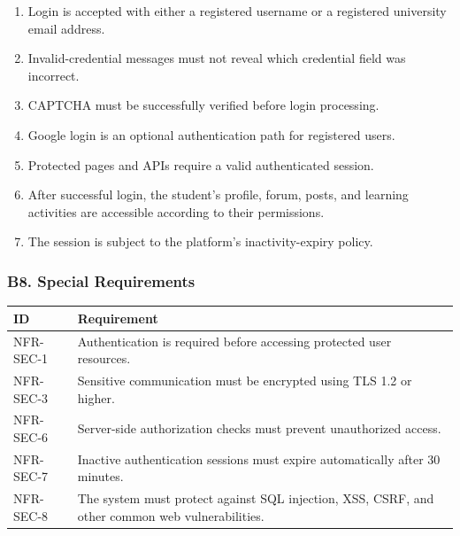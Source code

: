 \documentclass[12pt]{article}
\renewcommand{\baselinestretch}{1.5}
\begin{document}
\begin{enumerate}
\item Login is accepted with either a registered username or a registered university email address.
\item Invalid-credential messages must not reveal which credential field was incorrect.
\item CAPTCHA must be successfully verified before login processing.
\item Google login is an optional authentication path for registered users.
\item Protected pages and APIs require a valid authenticated session.
\item After successful login, the student's profile, forum, posts, and learning activities are accessible according to their permissions.
\item The session is subject to the platform's inactivity-expiry policy.
\end{enumerate}
\par\medskip

\hypertarget{sec:b8-special-requirements}{}
\subsubsection*{B8. Special Requirements}
\par\medskip

\begingroup
\small
\renewcommand{\baselinestretch}{1.0}\selectfont
\renewcommand{\arraystretch}{1.15}
\setlength{\tabcolsep}{6pt}
\begin{longtable}{|>{\raggedright\arraybackslash}p{}|>{\raggedright\arraybackslash}p{}|}
\hline
\textbf{ID} & \textbf{Requirement} \\ \hline
\endhead
NFR-SEC-1 & Authentication is required before accessing protected user resources. \\ \hline
NFR-SEC-3 & Sensitive communication must be encrypted using TLS 1.2 or higher. \\ \hline
NFR-SEC-6 & Server-side authorization checks must prevent unauthorized access. \\ \hline
NFR-SEC-7 & Inactive authentication sessions must expire automatically after 30 minutes. \\ \hline
NFR-SEC-8 & The system must protect against SQL injection, XSS, CSRF, and other common web vulnerabilities. \\ \hline
\end{longtable}
\endgroup
\par\medskip
\end{document}
